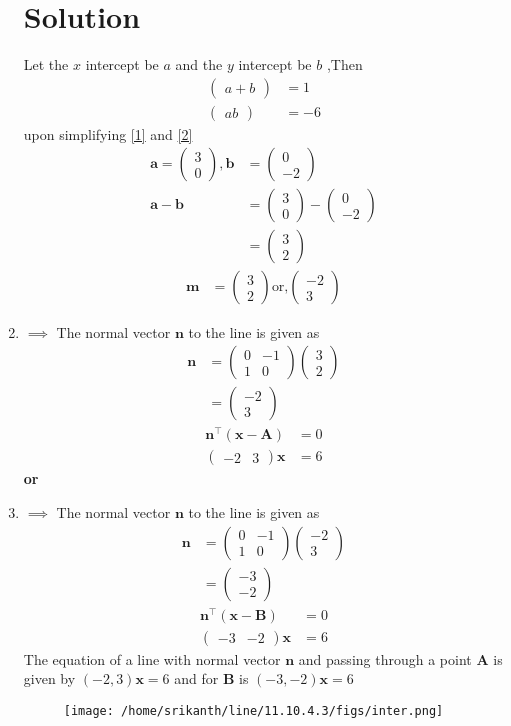 \documentclass[12pt]{article}
\providecommand{\brak}[1]{\ensuremath{\left(#1\right)}}
\newcommand{\myvec}[1]{\ensuremath{\begin{pmatrix}#1\end{pmatrix}}}
\let\vec\mathbf
\begin{document}
\begin{enumerate}
\section{Solution}
Let the $x$ intercept be $a$ and  the $y$ intercept be $b$ ,Then
\begin{align}
\myvec{a+b}&=1\label{1}\\
\myvec{ab}&=-6 \label{2}
\end{align}
upon simplifying \eqref{1} and \eqref{2}
\begin{align}
\vec{a}=\myvec{3\\0},\vec{b}&=\myvec{0\\-2}\\
\vec{a-b}&=\myvec{3\\0}-\myvec{0\\-2}\\
&=\myvec{3\\2}
\end{align}
\begin{align}		
\vec{m}&=\myvec{3\\2} \text{or,} \myvec{-2\\3}
\end{align}
\item 
$\implies$ The normal vector $\vec{n}$ to the line is given as
\begin{align}
\vec{n}&=\myvec{0&-1\\1&0}\myvec{3\\2}\\
&=\myvec{-2 \\3} 
\end{align}
\begin{align}
	\vec{n}^\top\brak{\vec{x}-\vec{A}} &= 0 \\
	\myvec { -2 & 3 } \vec{x}  &= 6  
\end{align}
   \textbf{or}\\
\item 
$\implies$ The normal vector $\vec{n}$ to the line is given as
\begin{align}
\vec{n}&=\myvec{0&-1\\1&0}\myvec{-2\\3}\\
&=\myvec{-3 \\-2} 
\end{align}
\begin{align}
    \vec{n}^\top\brak{\vec{x}-\vec{B}} &= 0 \\  
	\myvec { -3 & -2 }  \vec{x}  &= 6        
\end{align}
The equation of a line with normal vector $\vec{n}$ and passing through a point $\vec{A}$ is given by $(-2,3)\vec{x}=6$ and for $\vec{B}$ is $(-3,-2)\vec{x}=6$
\begin{figure}[h!]
\centering
\texttt{[image: /home/srikanth/line/11.10.4.3/figs/inter.png]}
\caption{}
\label{fig:line segment}
\end{figure}
\end{enumerate}
\end{document}
